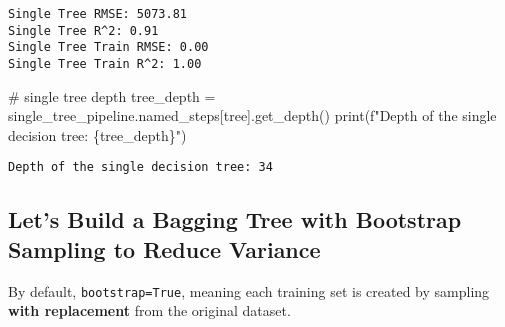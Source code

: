 \documentclass[
  letterpaper,
  DIV=11,
  numbers=noendperiod]{scrreprt}
\newenvironment{Shaded}{\begin{snugshade}}{\end{snugshade}}
\newcommand{\BuiltInTok}[1]{\textcolor[rgb]{0.00,0.23,0.31}{#1}}
\newcommand{\CommentTok}[1]{\textcolor[rgb]{0.37,0.37,0.37}{#1}}
\newcommand{\NormalTok}[1]{\textcolor[rgb]{0.00,0.23,0.31}{#1}}
\newcommand{\OperatorTok}[1]{\textcolor[rgb]{0.37,0.37,0.37}{#1}}
\newcommand{\SpecialCharTok}[1]{\textcolor[rgb]{0.37,0.37,0.37}{#1}}
\newcommand{\SpecialStringTok}[1]{\textcolor[rgb]{0.13,0.47,0.30}{#1}}
\newcommand{\StringTok}[1]{\textcolor[rgb]{0.13,0.47,0.30}{#1}}
\begin{document}
\begin{verbatim}
Single Tree RMSE: 5073.81
Single Tree R^2: 0.91
Single Tree Train RMSE: 0.00
Single Tree Train R^2: 1.00
\end{verbatim}

\begin{Shaded}
\begin{Highlighting}[]
\CommentTok{\# single tree depth}
\NormalTok{tree\_depth }\OperatorTok{=}\NormalTok{ single\_tree\_pipeline.named\_steps[}\StringTok{\textquotesingle{}tree\textquotesingle{}}\NormalTok{].get\_depth()}
\BuiltInTok{print}\NormalTok{(}\SpecialStringTok{f"Depth of the single decision tree: }\SpecialCharTok{\{}\NormalTok{tree\_depth}\SpecialCharTok{\}}\SpecialStringTok{"}\NormalTok{)}
\end{Highlighting}
\end{Shaded}

\begin{verbatim}
Depth of the single decision tree: 34
\end{verbatim}

\subsection{Let's Build a Bagging Tree with Bootstrap Sampling to Reduce
Variance}\label{lets-build-a-bagging-tree-with-bootstrap-sampling-to-reduce-variance}

By default, \texttt{bootstrap=True}, meaning each training set is
created by sampling \textbf{with replacement} from the original dataset.
\end{document}
